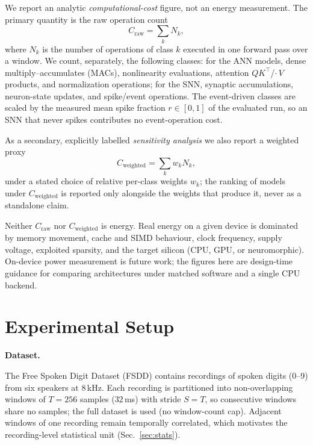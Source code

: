 \documentclass[conference]{IEEEtran}
\begin{document}
\par We report an analytic \emph{computational-cost} figure, not an energy
measurement. The primary quantity is the raw operation count
\begin{equation}
  C_{\mathrm{raw}} = \sum_k N_k,
  \label{eq:craw}
\end{equation}
where $N_k$ is the number of operations of class $k$ executed in one forward pass
over a window. We count, separately, the following classes: for the ANN models,
dense multiply--accumulates (MACs), nonlinearity evaluations, attention
$QK^{\top}$/$\cdot\,V$ products, and normalization operations; for the SNN,
synaptic accumulations, neuron-state updates, and spike/event operations. The
event-driven classes are scaled by the measured mean spike fraction
$r\in[0,1]$ of the evaluated run, so an SNN that never spikes contributes no
event-operation cost.

\par As a secondary, explicitly labelled \emph{sensitivity analysis} we also
report a weighted proxy
\begin{equation}
  C_{\mathrm{weighted}} = \sum_k w_k N_k,
  \label{eq:cweighted}
\end{equation}
under a stated choice of relative per-class weights $w_k$; the ranking of models
under $C_{\mathrm{weighted}}$ is reported only alongside the weights that produce
it, never as a standalone claim.

\par Neither $C_{\mathrm{raw}}$ nor $C_{\mathrm{weighted}}$ is energy. Real energy
on a given device is dominated by memory movement, cache and SIMD behaviour, clock
frequency, supply voltage, exploited sparsity, and the target silicon
(CPU, GPU, or neuromorphic). On-device power measurement is future work; the
figures here are design-time guidance for comparing architectures under matched
software and a single CPU backend.

\section{Experimental Setup}
\label{sec:setup}

\textbf{Dataset.}
\par The Free Spoken Digit Dataset (FSDD) \cite{jackson2018fsdd} contains
recordings of spoken digits (0--9) from six speakers at 8\,kHz. Each recording
is partitioned into non-overlapping windows of $T=256$ samples ($32\,$ms) with
stride $S=T$, so consecutive windows share no samples; the full dataset is used
(no window-count cap). Adjacent windows of one recording remain temporally
correlated, which motivates the recording-level statistical unit
(Sec.~\ref{sec:stats}).
\end{document}
